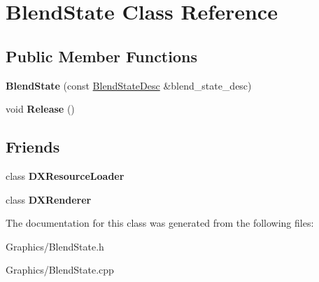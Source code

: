 \hypertarget{classBlendState}{}\section{Blend\+State Class Reference}
\label{classBlendState}
\subsection*{Public Member Functions}
\begin{DoxyCompactItemize}
\item 
\mbox{\label{classBlendState_a7ea0025743426a3da3a0accd63c976c8}} 
{\bfseries Blend\+State} (const \hyperlink{structBlendStateDesc}{Blend\+State\+Desc} \&blend\+\_\+state\+\_\+desc)
\item 
\mbox{\label{classBlendState_a7c1b6e58093b0c33da63eae2742a7bed}} 
void {\bfseries Release} ()
\end{DoxyCompactItemize}
\subsection*{Friends}
\begin{DoxyCompactItemize}
\item 
\mbox{\label{classBlendState_a871268c492209c5a9db9dc2db99f4d04}} 
class {\bfseries D\+X\+Resource\+Loader}
\item 
\mbox{\label{classBlendState_a14ab6f966322dccbf6597d0c82bf48c6}} 
class {\bfseries D\+X\+Renderer}
\end{DoxyCompactItemize}


The documentation for this class was generated from the following files\+:\begin{DoxyCompactItemize}
\item 
Graphics/Blend\+State.\+h\item 
Graphics/Blend\+State.\+cpp\end{DoxyCompactItemize}

